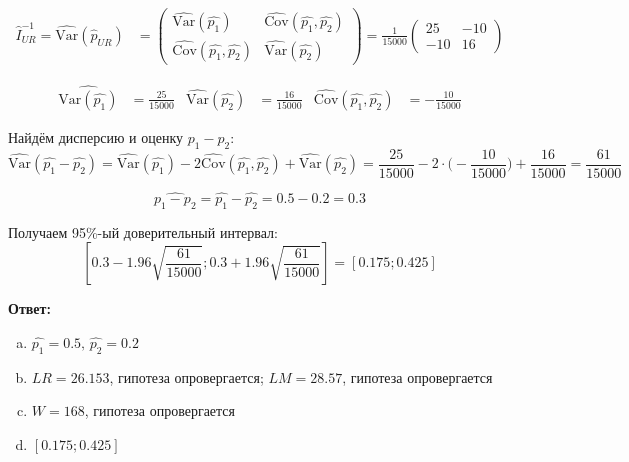 \documentclass[12pt,letterpaper]{article}
\newcommand{\Var}{\mathrm{Var}}
\newcommand{\Cov}{\mathrm{Cov}}
\begin{document}
\begin{enumerate} [a)]
{        \begin{align*}
             \hat{I}_{UR}^{-1} = \widehat{\Var}(\hat{p}_{UR})
             &= 
            \begin{pmatrix}
                \widehat{\Var}(\hat{p_1}) & \widehat{\Cov}(\hat{p_1},\hat{p_2}) \\
                \widehat{\Cov}(\hat{p_1},\hat{p_2}) & \widehat{\Var}(\hat{p_2})
            \end{pmatrix}
            = \frac{1}{15000}
            \begin{pmatrix}
                25 & -10 \\
                -10 & 16
            \end{pmatrix}
        \end{align*}
        
        \begin{align*}
            \widehat{\Var(\hat{p_1})} &= \frac{25}{15000} & \widehat{\Var}(\hat{p_2}) &= \frac{16}{15000} & \widehat{\Cov}(\hat{p_1}, \hat{p_2}) &= -\frac{10}{15000}
        \end{align*}
        
        Найдём дисперсию и оценку $p_1 - p_2$:
        $$\widehat{\Var}(\hat{p_1} - \hat{p_2}) = \widehat{\Var}(\hat{p_1}) - 2\widehat{\Cov}(\hat{p_1}, \hat{p_2}) + \widehat{\Var}(\hat{p_2}) = \frac{25}{15000} - 2\cdot \Big(-\frac{10}{15000}\Big) + \frac{16}{15000} = \frac{61}{15000}$$
        
        $$\widehat{p_1 - p_2} = \hat{p_1} - \hat{p_2} = 0.5 - 0.2 = 0.3$$
        
        Получаем 95\%-ый доверительный интервал:
        $$\left[0.3 - 1.96\sqrt{\frac{61}{15000}} ; 0.3 + 1.96\sqrt{\frac{61}{15000}}\right] = [0.175 ; 0.425]$$
    }
\end{enumerate}
\textbf{Ответ:}
\begin{enumerate} [a)]
    \item $\hat{p_1} = 0.5, \, \hat{p_2} = 0.2$
    \item $LR = 26.153$, гипотеза опровергается; $LM = 28.57$, гипотеза опровергается
    \item $W = 168$, гипотеза опровергается
    \item $[0.175; 0.425]$
\end{enumerate}
\end{document}
